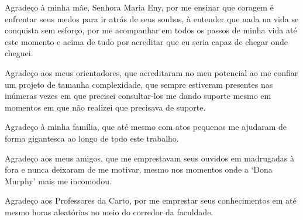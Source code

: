 
Agradeço à minha mãe, Senhora Maria Eny, por me ensinar que coragem é enfrentar seus medos para ir atrás de seus sonhos, à entender que nada na vida se conquista sem esforço, por me acompanhar em todos os passos de minha vida até este momento e acima de tudo por acreditar que eu seria capaz de chegar onde cheguei.

Agradeço aos meus orientadores, que acreditaram no meu potencial ao me confiar um projeto de tamanha complexidade, que sempre estiveram presentes nas inúmeras vezes em que precisei consultar-los me dando suporte mesmo em momentos em que não realizei que precisava de suporte.

Agradeço à minha família, que até mesmo com atos pequenos me ajudaram de forma gigantesca ao longo de todo este trabalho.

Agradeço aos meus amigos, que me emprestavam seus ouvidos em madrugadas à fora e nunca deixaram de me motivar, mesmo nos momentos onde a `Dona Murphy' mais me incomodou.

Agradeço aos Professores da Carto, por me emprestar seus conhecimentos em até mesmo horas aleatórias no meio do corredor da faculdade.

